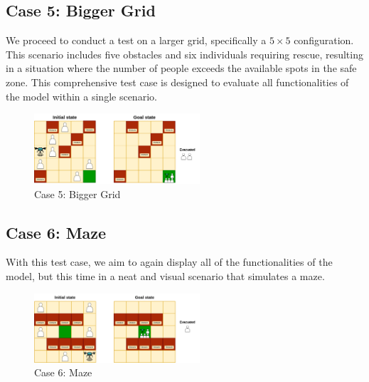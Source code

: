 \documentclass{article}
\begin{document}
\subsection{Case 5: Bigger Grid}

We proceed to conduct a test on a larger grid, specifically a \(5 \times 5\) configuration. This scenario includes five obstacles and six individuals requiring rescue, resulting in a situation where the number of people exceeds the available spots in the safe zone. This comprehensive test case is designed to evaluate all functionalities of the model within a single scenario.

\begin{figure}[ht]
    \centering
    \includegraphics[width=0.55\textwidth]{assets/problem-5-big.drawio.png}
    \caption{Case 5: Bigger Grid}
    \label{fig:initial-state-bigger-grid}
\end{figure}

\FloatBarrier

\subsection{Case 6: Maze}

With this test case, we aim to again display all of the functionalities of the model, but this time in a neat and visual scenario that simulates a maze.

\begin{figure}[ht]
    \centering
    \includegraphics[width=0.55\textwidth]{assets/problem-6-maze.drawio.png} %
    \caption{Case 6: Maze}
    \label{fig:initial-state-maze}
\end{figure}
\end{document}
